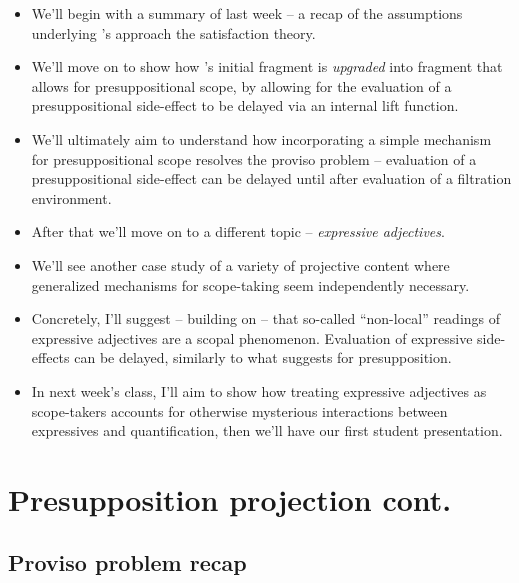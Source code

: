 \documentclass[nols,twoside,nofonts,nobib,nohyper]{tufte-handout}
\begin{document}
\begin{itemize}

    \item We'll begin with a summary of last week -- a recap of the assumptions underlying \citeauthor{grove2019}'s approach the satisfaction theory.

    \item We'll move on to show how \citeauthor{grove2019}'s initial fragment is \textit{upgraded} into fragment that allows for presuppositional scope, by allowing for the evaluation of a presuppositional side-effect to be delayed via an internal lift function.

    \item We'll ultimately aim to understand how incorporating a simple mechanism for presuppositional scope resolves the proviso problem -- evaluation of a presuppositional side-effect can be delayed until after evaluation of a filtration environment.

  \item After that we'll move on to a different topic -- \textit{expressive adjectives}.

    \item We'll see another case study of a variety of projective content where generalized mechanisms for scope-taking seem independently necessary.

    \item Concretely, I'll suggest -- building on \cite{elliott-fuck} -- that so-called \enquote{non-local} readings of expressive adjectives are a scopal phenomenon. Evaluation of expressive side-effects can be delayed, similarly to what \citeauthor{grove2019} suggests for presupposition.

    \item In next week's class, I'll aim to show how treating expressive adjectives as scope-takers accounts for otherwise mysterious interactions between expressives and quantification, then we'll have our first student presentation.

\end{itemize}

\section{Presupposition projection cont.}

\subsection{Proviso problem recap}
\end{document}
